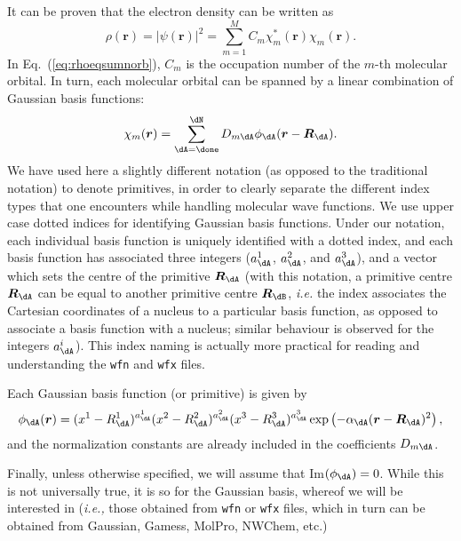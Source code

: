 It can be proven that the electron density can be written as
%
\begin{equation}\label{eq:rhoeqsumnorb}
   \rho(\boldsymbol r)=\left|\psi(\boldsymbol{r})\right|^2=\sum_{m=1}^{M}C_m\chi_m^*(\boldsymbol{r})\chi_m(\boldsymbol{r}).
\end{equation}
%
In Eq.~(\ref{eq:rhoeqsumnorb}), $C_m$ is the occupation number of the $m$-th molecular orbital.
In turn, each molecular orbital can be spanned by a linear combination of Gaussian basis functions:
\begin{equation}
   \chi_m(\boldsymbol{r})=\sum_{\dA=\done}^{\dN}D_{m\dA}\phi_{\dA}(\boldsymbol{r}-\boldsymbol{R}_{\dA}).
\end{equation}
%
We have used here a slightly different notation (as opposed to the traditional notation) to denote
primitives, in order to clearly separate the different index types that one encounters while handling
molecular wave functions. We use upper case dotted indices for identifying Gaussian basis functions.
Under our notation, each individual basis function is uniquely identified with a dotted index, and
each basis function has associated three integers ($a^1_{\dA}$, $a^2_{\dA}$, and $a^3_{\dA}$), and a
vector which sets the centre of the primitive $\boldsymbol{R}_{\dA}$ (with this notation, a
primitive centre $\boldsymbol{R}_{\dA}$ can be equal to another primitive centre
$\boldsymbol{R}_{\dB}$, \textit{i.e.} the index associates the Cartesian coordinates of a nucleus
to a particular basis function, as opposed to associate a basis function with a nucleus;
similar behaviour is observed for the integers $a^i_{\dA}$). This index naming is actually more
practical for reading and understanding the \texttt{wfn} and \texttt{wfx} files. 

Each Gaussian basis function (or primitive) is given by
%
\begin{equation}\label{eq:primitivedef}
   \phi_{\dA}(\boldsymbol{r})=(x^1-R^1_{\dA})^{a^1_{\dA}}(x^2-R^2_{\dA})^{a^2_{\dA}}(x^3-R^3_{\dA})^{a^3_{\dA}}
   \exp\left(-\alpha_{\dA}(\boldsymbol{r}-\boldsymbol{R}_{\dA})^2\right),
\end{equation}
%
and the normalization constants are already included in the coefficients $D_{m\dA}$.

Finally, unless otherwise specified, we will assume that Im$(\phi_{\dA})=0$. While this is not universally true,
it is so for the Gaussian basis, whereof we will be interested in (\textit{i.e.,} those obtained from \texttt{wfn} or \texttt{wfx} files, which in turn can be obtained from Gaussian, Gamess, MolPro, NWChem, etc.)



